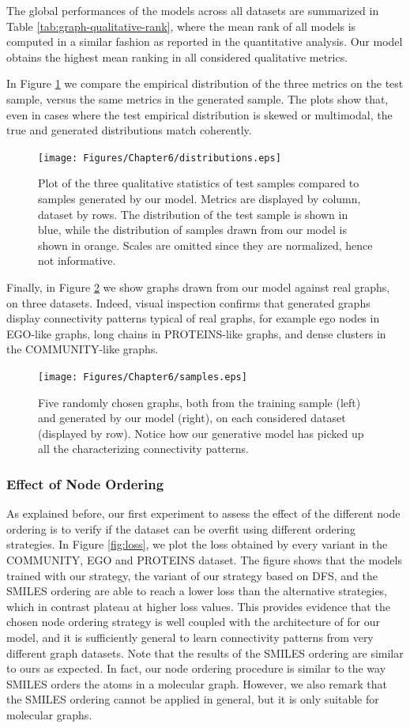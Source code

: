 The global performances of the models across all datasets are summarized in Table \ref{tab:graph-qualitative-rank}, where the mean rank of all models is computed in a similar fashion as reported in the quantitative analysis. Our model obtains the highest mean ranking in all considered qualitative metrics.

In Figure \ref{fig:distributions} we compare the empirical distribution of the three metrics on the test sample, versus the same metrics in the generated sample. The plots show that, even in cases where the test empirical distribution is skewed or multimodal, the true and generated distributions match coherently.
\begin{figure}[h!]
\centering
\texttt{[image: Figures/Chapter6/distributions.eps]}
\caption{Plot of the three qualitative statistics of test samples compared to samples generated by our model. Metrics are displayed by column, dataset by rows. The distribution of the test sample is shown in blue, while the distribution of samples drawn from our model is shown in orange. Scales are omitted since they are normalized, hence not informative.}
\label{fig:distributions}
\end{figure}
Finally, in Figure \ref{fig:samples} we show graphs drawn from our model against real graphs, on three datasets. Indeed, visual inspection confirms that generated graphs display connectivity patterns typical of real graphs, for example ego nodes in EGO-like graphs, long chains in PROTEINS-like graphs, and dense clusters in the COMMUNITY-like graphs.
\begin{figure}[h!]
\centering
\texttt{[image: Figures/Chapter6/samples.eps]}
\caption{Five randomly chosen graphs, both from the training sample (left) and generated by our model (right), on each considered dataset (displayed by row). Notice how our generative model has picked up all the characterizing connectivity patterns.}
\label{fig:samples}
\end{figure}

\subsubsection*{Effect of Node Ordering}
As explained before, our first experiment to assess the effect of the different node ordering is to verify if the dataset can be overfit using different ordering strategies. In Figure \ref{fig:loss}, we plot the loss obtained by every variant in the COMMUNITY, EGO and PROTEINS dataset. The figure shows that the models trained with our strategy, the variant of our strategy based on DFS, and the SMILES ordering are able to reach a lower loss than the alternative strategies, which in contrast plateau at higher loss values. This provides evidence that the chosen node ordering strategy is well coupled with the architecture of for our model, and it is sufficiently general to learn connectivity patterns from very different graph datasets. Note that the results of the SMILES ordering are similar to ours as expected. In fact, our node ordering procedure is similar to the way SMILES orders the atoms in a molecular graph. However, we also remark that the SMILES ordering cannot be applied in general, but it is only suitable for molecular graphs.

